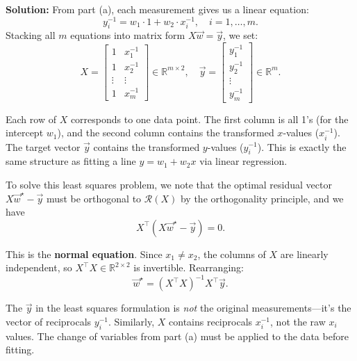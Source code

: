 \documentclass[10pt]{article}
\theoremstyle{definition}
\theoremstyle{plain}
\newcommand{\RR}{\mathbb{R}}
\newcommand{\Range}{\mathcal{R}}
\begin{document}
\begin{enumerate}[label=(\alph*)]
    \textbf{Solution:} From part (a), each measurement gives us a linear equation:
    \[
        y_i^{-1} = w_1 \cdot 1 + w_2 \cdot x_i^{-1}, \quad i = 1, \ldots, m.
    \]
    Stacking all $m$ equations into matrix form $X\vec{w} = \vec{y}$, we set:
    \begin{equation}
        X = \begin{bmatrix} 1 & x_1^{-1} \\ 1 & x_2^{-1} \\ \vdots & \vdots \\ 1 & x_m^{-1} \end{bmatrix} \in \RR^{m \times 2}, \quad \vec{y} = \begin{bmatrix} y_1^{-1} \\ y_2^{-1} \\ \vdots \\ y_m^{-1} \end{bmatrix} \in \RR^m.
    \end{equation}

    \begin{intuition}
    Each row of $X$ corresponds to one data point. The first column is all 1's (for the intercept $w_1$), and the second column contains the transformed $x$-values ($x_i^{-1}$). The target vector $\vec{y}$ contains the transformed $y$-values ($y_i^{-1}$). This is exactly the same structure as fitting a line $y = w_1 + w_2 x$ via linear regression.
    \end{intuition}

    To solve this least squares problem, we note that the optimal residual vector $X\vec{w}^\star - \vec{y}$ must be orthogonal to $\Range(X)$ by the orthogonality principle, and we have
    \begin{equation}
        X^\top(X\vec{w}^\star - \vec{y}) = 0.
    \end{equation}

    This is the \textbf{normal equation}. Since $x_1 \neq x_2$, the columns of $X$ are linearly independent, so $X^\top X \in \RR^{2 \times 2}$ is invertible. Rearranging:
    \begin{equation}
        \vec{w}^\star = (X^\top X)^{-1} X^\top \vec{y}.
    \end{equation}

    \begin{pitfall}
    The $\vec{y}$ in the least squares formulation is \emph{not} the original measurements---it's the vector of reciprocals $y_i^{-1}$. Similarly, $X$ contains reciprocals $x_i^{-1}$, not the raw $x_i$ values. The change of variables from part (a) must be applied to the data before fitting.
    \end{pitfall}


\end{enumerate}
\end{document}
